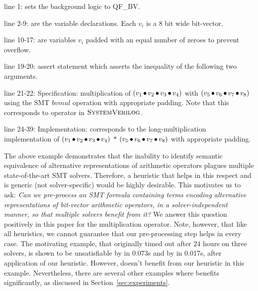 \noindent line 1: sets the background logic to QF\_BV.

\noindent line 2-9: are the variable declarations. Each  $v_i$ is a 8 bit wide bit-vector.

\noindent line 10-17: are variables $v_i$ padded with an equal number of zeroes to prevent overflow.

\noindent line 19-20: assert statement which asserts the inequality of the following two arguments.

\noindent line 21-22: Specification: multiplication of $(v_1 \mathop{\bullet} v_2 \mathop{\bullet} v_3 \mathop{\bullet} v_4)$ with $(v_5 \mathop{\bullet} v_6 \mathop{\bullet} v_7 \mathop{\bullet} v_8)$ using the SMT $bvmul$ operation with appropriate padding. Note that this corresponds to {\tt *} operator in $\textsc{SystemVerilog}$.

\noindent line 24-39: Implementation: corresponds to the long-multiplication implementation of $(v_1 \mathop{\bullet} v_2 \mathop{\bullet} v_3 \mathop{\bullet} v_4)$ $*$ $(v_5 \mathop{\bullet} v_6 \mathop{\bullet} v_7 \mathop{\bullet} v_8)$ with appropriate padding.

\vspace{0.2 cm}
The above example demonstrates that the inability to identify semantic
equivalence of alternative representations of arithmetic operators
plagues multiple state-of-the-art SMT solvers.  Therefore, a heuristic
that helps in this respect and is generic (not solver-specific) would
be highly desirable.  This motivates us to ask: \emph{Can we
pre-process an SMT formula containing terms encoding alternative
representations of bit-vector arithmetic operators, in a
solver-independent manner, so that multiple solvers benefit from it?}
We answer this question positively in this paper for the
multiplication operator.  Note, however, that like all heuristics, we
cannot guarantee that our pre-processing step helps in every case.
The motivating example, that originally timed out after $24$ hours on
three solvers, is shown to be unsatisfiable by {\zthree} in 0.073s and
by {\cvcfour} in 0.017s, after application of our heuristic. However,
{\boolector} doesn't benefit from our heuristic in this example.
Nevertheless, there are several other examples where {\boolector}
benefits significantly, as discussed in Section~\ref{sec:experiments}.

